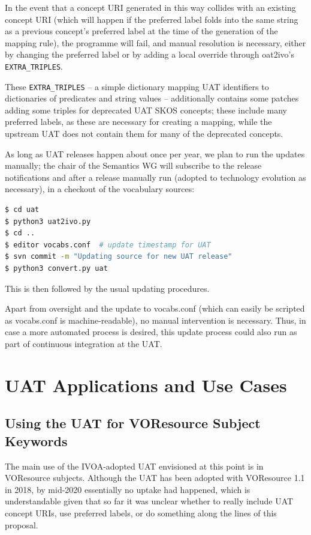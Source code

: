 \documentclass[11pt,a4paper]{ivoa}
\begin{document}
In the event that a concept URI generated in this way collides with an
existing concept URI (which will happen if the preferred label folds
into the same string as a previous concept's preferred label at the time
of the generation of the mapping rule), the programme will fail, and
manual resolution is necessary, either by changing the preferred label
or by adding a local override through oat2ivo's \verb|EXTRA_TRIPLES|.

These \verb|EXTRA_TRIPLES| -- a simple dictionary mapping UAT
identifiers to dictionaries of predicates and string values --
additionally contains some patches adding some triples for deprecated
UAT SKOS concepts; these include many preferred labels, as these are
necessary for creating a mapping, while the upstream UAT does not contain
them for many of the deprecated concepts.

As long as UAT releases happen about once per year, we plan to run the
updates manually; the chair of the Semantics WG will subscribe to the
release notifications and after a release manually run (adopted to
technology evolution as necessary), in a checkout of the vocabulary
sources:

\begin{lstlisting}[language=sh]
$ cd uat
$ python3 uat2ivo.py
$ cd ..
$ editor vocabs.conf  # update timestamp for UAT
$ svn commit -m "Updating source for new UAT release"
$ python3 convert.py uat
\end{lstlisting}

This is then followed by the usual updating procedures.

Apart from oversight and the update to vocabs.conf (which can easily be
scripted as vocabs.conf is machine-readable),  no manual intervention is
necessary.  Thus, in case a more automated process is desired, this
update process could also run as part of continuous integration at the
UAT.

\section{UAT Applications and Use Cases}

\subsection{Using the UAT for VOResource Subject Keywords}

The main use of the IVOA-adopted UAT envisioned at this point is in
VOResource subjects.  Although the UAT has been adopted with VOResource
1.1 in 2018, by mid-2020 essentially no uptake had happened, which is
understandable given that so far it was unclear whether to really include UAT
concept URIs, use preferred labels, or do something along the
lines of this proposal.
\end{document}

